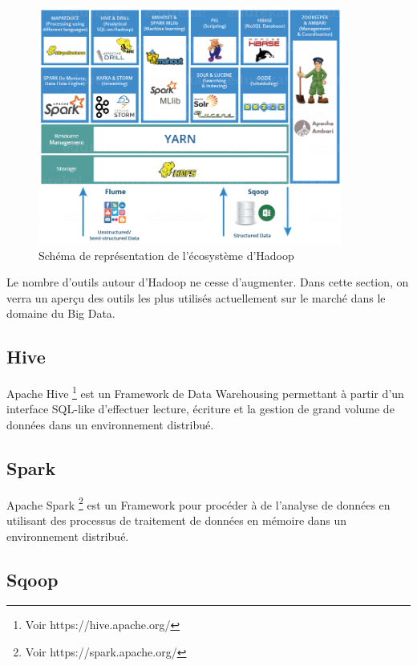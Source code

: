 \documentclass[12pt,english]{book}
\begin{document}
\begin{figure}[ht]
	\centering
	\includegraphics[width=10cm]{hadoopEco}
	\caption[Schéma de représentation de l'écosystème d'Hadoop]{Schéma de représentation de l'écosystème d'Hadoop \footnotemark}
\end{figure}


Le nombre d’outils autour d’Hadoop ne cesse d’augmenter. Dans cette section, on verra un aperçu des outils les plus utilisés actuellement sur le marché dans le domaine du Big Data.


\subsection{Hive}

Apache Hive \footnote{Voir https://hive.apache.org/} est un Framework de Data Warehousing permettant à partir d’un interface SQL-like d’effectuer lecture, écriture et   la gestion de grand volume de données dans un environnement distribué.

\subsection{Spark}

Apache Spark \footnote{Voir https://spark.apache.org/} est un Framework pour procéder à de l’analyse de données en utilisant des processus de traitement de données en mémoire dans un environnement distribué.

\subsection{Sqoop}
\end{document}
